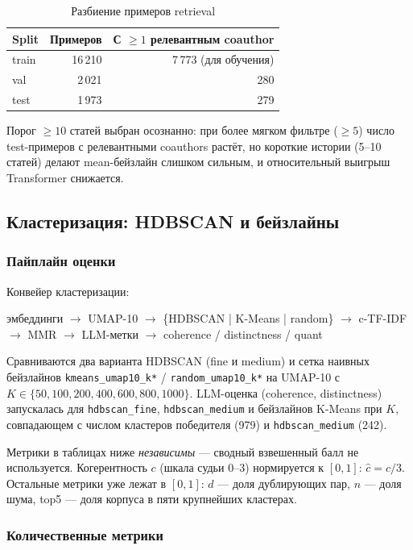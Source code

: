 \begin{table}[ht]
\caption{Разбиение примеров retrieval}
\label{tab:splits}
\centering
\footnotesize
\begin{tabular}{lrr}
\toprule
Split & Примеров & С $\geq 1$ релевантным coauthor \\
\midrule
train & 16\,210 & 7\,773 (для обучения) \\
val   & 2\,021  & 280 \\
test  & 1\,973  & 279 \\
\bottomrule
\end{tabular}
\end{table}

Порог $\geq 10$ статей выбран осознанно: при более мягком фильтре ($\geq 5$) число test-примеров
с релевантными coauthors растёт, но короткие истории (5–10 статей) делают mean-бейзлайн слишком
сильным, и относительный выигрыш Transformer снижается.

\subsection{Кластеризация: HDBSCAN и бейзлайны}
\label{sec:exp-cluster}

\subsubsection{Пайплайн оценки}

Конвейер кластеризации:
\begin{center}
\small
эмбеддинги $\to$ UMAP-10 $\to$ \{HDBSCAN | K-Means | random\}
$\to$ c-TF-IDF $\to$ MMR $\to$ LLM-метки $\to$ coherence / distinctness / quant
\end{center}

Сравниваются два варианта HDBSCAN (fine и medium) и сетка наивных бейзлайнов
\texttt{kmeans\_umap10\_k*} / \texttt{random\_umap10\_k*} на UMAP-10 с $K \in \{50, 100, 200, 400,
600, 800, 1000\}$. LLM-оценка (coherence, distinctness) запускалась для \texttt{hdbscan\_fine},
\texttt{hdbscan\_medium} и бейзлайнов K-Means при $K$, совпадающем с числом кластеров победителя
(979) и \texttt{hdbscan\_medium} (242).

Метрики в таблицах ниже \emph{независимы} — сводный взвешенный балл не используется. Когерентность
$c$ (шкала судьи 0–3) нормируется к $[0,1]$: $\hat{c} = c/3$. Остальные метрики уже лежат в $[0,1]$:
$d$ — доля дублирующих пар, $n$ — доля шума, top5 — доля корпуса в пяти крупнейших кластерах.

\subsubsection{Количественные метрики}

